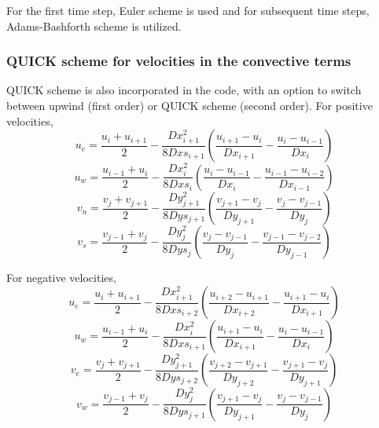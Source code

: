 \documentclass[12pt,a4paper,fleqn]{article}
\begin{document}
For the first time step, Euler scheme is used and for subsequent time steps, Adams-Bashforth scheme is utilized.

\subsubsection{QUICK scheme for velocities in the convective terms}
QUICK scheme is also incorporated in the code, with an option to switch between upwind (first order) or QUICK scheme (second order). For positive velocities,
\begin{equation*}
u_e = \frac{u_{i} + u_{i+1}}{2} - \frac{Dx_{i+1}^2}{8Dxs_{i+1}}
\left(\frac{u_{i+1} - u_{i}}{Dx_{i+1}} - \frac{u_{i} - u_{i-1}}{Dx_{i}}\right)
\end{equation*}
\begin{equation*}
u_w = \frac{u_{i-1} + u_{i}}{2} - \frac{Dx_{i}^2}{8Dxs_{i}}
\left(\frac{u_{i} - u_{i-1}}{Dx_{i}} - \frac{u_{i-1} - u_{i-2}}{Dx_{i-1}}\right)
\end{equation*}
\begin{equation*}
v_n = \frac{v_{j} + v_{j+1}}{2} - \frac{Dy_{j+1}^2}{8Dys_{j+1}}
\left(\frac{v_{j+1} - v_{j}}{Dy_{j+1}} - \frac{v_{j} - v_{j-1}}{Dy_{j}}\right)
\end{equation*}
\begin{equation*}
v_s = \frac{v_{j-1} + v_{j}}{2} - \frac{Dy_{j}^2}{8Dys_{j}}
\left(\frac{v_{j} - v_{j-1}}{Dy_{j}} - \frac{v_{j-1} - v_{j-2}}{Dy_{j-1}}\right)
\end{equation*}

For negative velocities,
\begin{equation*}
u_e = \frac{u_{i} + u_{i+1}}{2} - \frac{Dx_{i+1}^2}{8Dxs_{i+2}}
\left(\frac{u_{i+2} - u_{i+1}}{Dx_{i+2}} - \frac{u_{i+1} - u_{i}}{Dx_{i+1}}
\right)
\end{equation*}
\begin{equation*}
u_w = \frac{u_{i-1} + u_{i}}{2} - \frac{Dx_{i}^2}{8Dxs_{i+1}}
\left(\frac{u_{i+1} - u_{i}}{Dx_{i+1}} - \frac{u_{i} - u_{i-1}}{Dx_{i}}\right)
\end{equation*}
\begin{equation*}
v_e = \frac{v_{j} + v_{j+1}}{2} - \frac{Dy_{j+1}^2}{8Dys_{j+2}}
\left(\frac{v_{j+2} - v_{j+1}}{Dy_{j+2}} - \frac{v_{j+1} - v_{j}}{Dy_{j+1}}
\right)
\end{equation*}
\begin{equation*}
v_w = \frac{v_{j-1} + v_{j}}{2} - \frac{Dy_{j}^2}{8Dys_{j+1}}
\left(\frac{v_{j+1} - v_{j}}{Dy_{j+1}} - \frac{v_{j} - v_{j-1}}{Dy_{j}}\right)
\end{equation*}
\end{document}
